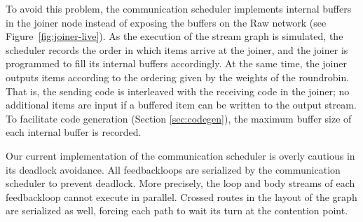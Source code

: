To avoid this problem, the communication scheduler implements internal
buffers in the joiner node instead of exposing the buffers on the Raw
network (see Figure~\ref{fig:joiner-live}).  As the execution of the
stream graph is simulated, the scheduler records the order in which
items arrive at the joiner, and the joiner is programmed to fill its
internal buffers accordingly.  At the same time, the joiner outputs
items according to the ordering given by the weights of the
roundrobin.  That is, the sending code is interleaved with the
receiving code in the joiner; no additional items are input if a
buffered item can be written to the output stream.  To facilitate code
generation (Section \ref{sec:codegen}), the maximum buffer size of
each internal buffer is recorded.

Our current implementation of the communication scheduler is overly
cautious in its deadlock avoidance.  All feedbackloops are serialized
by the communication scheduler to prevent deadlock.  More precisely,
the loop and body streams of each feedbackloop cannot execute in
parallel.  Crossed routes in the layout of the graph are serialized as
well, forcing each path to wait its turn at the contention point.
